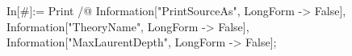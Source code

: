 In[\#]:= Print /@ {Information["PrintSourceAs", LongForm -> False], Information["TheoryName", LongForm -> False], Information["MaxLaurentDepth", LongForm -> False]}; 
